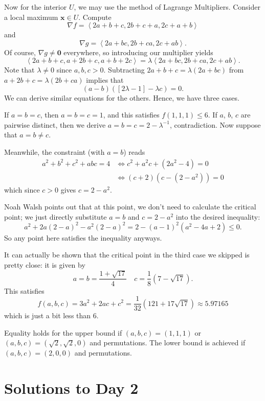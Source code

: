 \documentclass[11pt]{scrartcl}
\begin{document}
Now for the interior $U$, we may use the method of Lagrange Multipliers.
Consider a local maximum $\mathbf x \in U$.
Compute \[ \nabla f = \left<2a+b+c, 2b+c+a, 2c+a+b \right> \]
and \[ \nabla g = \left<2a+bc, 2b+ca, 2c+ab\right>. \]
Of course, $\nabla g \neq \mathbf 0$ everywhere,
so introducing our multiplier yields
\[ \left<2a+b+c,a+2b+c,a+b+2c\right> = \lambda \left<2a+bc,2b+ca,2c+ab\right>. \]
Note that $\lambda \neq 0$ since $a,b,c > 0$.
Subtracting $2a+b+c = \lambda(2a+bc)$ from $a+2b+c = \lambda(2b+ca)$
implies that \[ (a-b)(\left[ 2\lambda - 1 \right] - \lambda c) = 0. \]
We can derive similar equations for the others.
Hence, we have three cases.
\begin{enumerate}
  \ii If $a=b=c$, then $a=b=c=1$, and this satisfies $f(1,1,1) \le 6$.
  \ii If $a$, $b$, $c$ are pairwise distinct,
  then we derive $a = b = c = 2 - \lambda^{-1}$, contradiction.
  \ii Now suppose that $a=b \neq c$.

  Meanwhile, the constraint (with $a=b$) reads
  \begin{align*}
       a^2+b^2+c^2+abc=4
       &\iff c^2 + a^2c + (2a^2-4) = 0 \\
       &\iff (c+2)(c-(2-a^2)) = 0
  \end{align*}
  which since $c > 0$ gives $c = 2-a^2$.

  Noah Walsh points out that at this point,
  we don't need to calculate the critical point;
  we just directly substitute $a=b$ and $c=2-a^2$ into
  the desired inequality:
  \[ a^2+2a(2-a)^2-a^2(2-a)^2
    = 2 - (a-1)^2(a^2-4a+2) \le 0. \]
  So any point here satisfies the inequality anyways.
\end{enumerate}
\begin{remark*}
  It can actually be shown that the critical point
  in the third case we skipped is pretty close: it is given by
  \[ a = b = \frac{1+\sqrt{17}}{4}
    \quad c = \frac{1}{8} \left( 7 - \sqrt{17} \right). \]
  This satisfies
  \[ f(a,b,c) = 3a^2+2ac+c^2
    = \frac{1}{32} \left( 121 + 17\sqrt{17} \right)
    \approx 5.97165 \]
  which is just a bit less than $6$.
\end{remark*}
\begin{remark*}
  Equality holds for the upper bound if $(a,b,c)=(1,1,1)$
  or $(a,b,c)=(\sqrt2,\sqrt2,0)$ and permutations.
  The lower bound is achieved if $(a,b,c)=(2,0,0)$ and permutations.
\end{remark*}
\pagebreak

\section{Solutions to Day 2}
\end{document}
